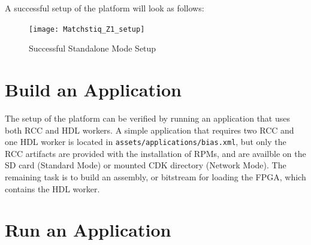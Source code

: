 \begin{enumerate}
\noindent A successful setup of the platform will look as follows:
\begin{figure}[H]
	\centerline{\texttt{[image: Matchstiq\_Z1\_setup]}}
	\caption{Successful Standalone Mode Setup}
	\label{fig:standalonesetup}
\end{figure} \medskip



\end{enumerate}

\pagebreak
\section{Build an Application}
\begin{flushleft}
The setup of the platform can be verified by running an application that uses both RCC and HDL workers. A simple application that requires two RCC and one HDL worker is located in \texttt{assets/applications/bias.xml}, but only the RCC artifacts are provided with the installation of RPMs, and are availble on the SD card (Standard Mode) or mounted CDK directory (Network Mode). The remaining task is to build an assembly, or bitstream for loading the FPGA, which contains the HDL worker.
\end{flushleft}

\section{Run an Application}
